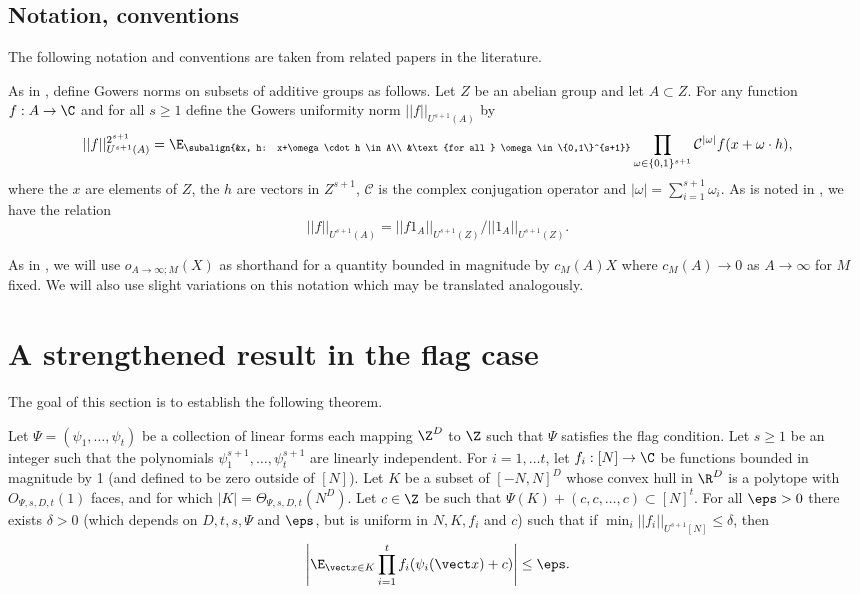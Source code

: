 \subsection{Notation, conventions}\label{ss:not-conv}
The following notation and conventions are taken from related papers in the literature. 

As in \cite[Appendix B]{GT10L}, define Gowers norms on subsets of additive groups as follows. Let $Z$ be an abelian group and let $A\subset Z$. For any function $f:A\to \C$ and for all $s \geq 1$ define the Gowers uniformity norm $||f||_{U^{s+1}(A)}$ by 
\[||f||_{U^{s+1}(A)}^{2^{s+1}} = \E_{\subalign{&x, h: x+\omega \cdot h \in A\\ &\text{for all } \omega \in \{0,1\}^{s+1}}} \prod_{\omega \in \{0,1\}^{s+1}} \mathcal{C}^{|\omega|} f(x + \omega \cdot h)  ,\]
where the $x$ are elements of $Z$, the $h$ are vectors in $Z^{s+1}$, $\mathcal{C}$ is the complex conjugation operator and $|\omega| = \sum_{i=1}^{s+1} \omega_i$. As is noted in \cite[Appendix B]{GT10L}, we have the relation 
\[ ||f||_{U^{s+1}{(A)}} =  ||f1_A||_{U^{s+1}{(Z)}}/||1_A||_{U^{s+1}{(Z)}}.\]

As in \cite{GT10}, we will use $o_{A\to \infty; M}(X)$ as shorthand for a quantity bounded in magnitude  by  $c_M(A)X$ where $c_M(A)\to 0$ as $A \to \infty$ for $M$ fixed. We will also use slight variations on this notation which may be translated analogously.  

\section{A strengthened result in the flag case}
The goal of this section is to establish the following theorem. 

\begin{thm}\label{t:flag}
Let $\Psi = (\psi_1, \ldots, \psi_t)$ be a collection of linear forms each mapping $\Z^D$ to $\Z$ such that $\Psi$ satisfies the flag condition. Let $s \geq 1$ be an integer such that the polynomials $\psi_1^{s+1},\ldots,\psi_t^{s+1}$ are linearly independent. For $i=1, \ldots t$,  let $f_i:[N] \to \C$ be functions bounded in magnitude by 1 (and defined to be zero outside of $[N]$). Let $K$ be a subset of $[-N,N]^D$ whose convex hull in $\R^D$ is a polytope with $O_{\Psi,s,D,t}(1)$ faces, and for which $|K| =  \Theta_{\Psi,s,D,t}(N^D)$. Let $c \in \Z$ be such that $\Psi(K) + (c,c,\ldots, c) \subset [N]^t$. For all $\eps >0$ there exists $\delta>0$ (which depends on $D,t,s,\Psi$ and $\eps$, but is uniform in $N,K,f_i$ and $c$) such that if $\min_{i} ||f_i||_{U^{s+1}[N]} \leq \delta$, then 
\[\left|\E_{\vect x \in K} \prod_{i=1}^t f_i(\psi_i(\vect x) + c)\right| \leq \eps.\] 
\end{thm}


